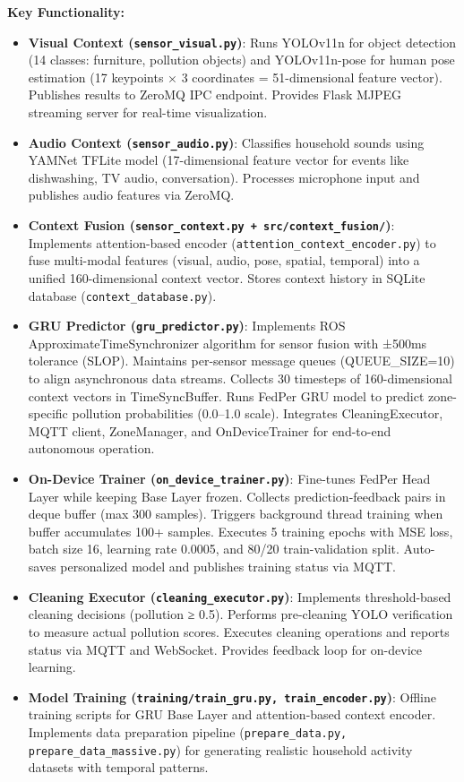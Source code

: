 \documentclass[conference]{IEEEtran}
\begin{document}
\textbf{Key Functionality:}
\begin{itemize}
    \item \textbf{Visual Context (\texttt{sensor\_visual.py})}: Runs YOLOv11n for object detection (14 classes: furniture, pollution objects) and YOLOv11n-pose for human pose estimation (17 keypoints × 3 coordinates = 51-dimensional feature vector). Publishes results to ZeroMQ IPC endpoint. Provides Flask MJPEG streaming server for real-time visualization.
    \item \textbf{Audio Context (\texttt{sensor\_audio.py})}: Classifies household sounds using YAMNet TFLite model (17-dimensional feature vector for events like dishwashing, TV audio, conversation). Processes microphone input and publishes audio features via ZeroMQ.
    \item \textbf{Context Fusion (\texttt{sensor\_context.py + src/context\_fusion/})}: Implements attention-based encoder (\texttt{attention\_context\_encoder.py}) to fuse multi-modal features (visual, audio, pose, spatial, temporal) into a unified 160-dimensional context vector. Stores context history in SQLite database (\texttt{context\_database.py}).
    \item \textbf{GRU Predictor (\texttt{gru\_predictor.py})}: Implements ROS ApproximateTimeSynchronizer algorithm for sensor fusion with ±500ms tolerance (SLOP). Maintains per-sensor message queues (QUEUE\_SIZE=10) to align asynchronous data streams. Collects 30 timesteps of 160-dimensional context vectors in TimeSyncBuffer. Runs FedPer GRU model to predict zone-specific pollution probabilities (0.0–1.0 scale). Integrates CleaningExecutor, MQTT client, ZoneManager, and OnDeviceTrainer for end-to-end autonomous operation.
    \item \textbf{On-Device Trainer (\texttt{on\_device\_trainer.py})}: Fine-tunes FedPer Head Layer while keeping Base Layer frozen. Collects prediction-feedback pairs in deque buffer (max 300 samples). Triggers background thread training when buffer accumulates 100+ samples. Executes 5 training epochs with MSE loss, batch size 16, learning rate 0.0005, and 80/20 train-validation split. Auto-saves personalized model and publishes training status via MQTT.
    \item \textbf{Cleaning Executor (\texttt{cleaning\_executor.py})}: Implements threshold-based cleaning decisions (pollution ≥ 0.5). Performs pre-cleaning YOLO verification to measure actual pollution scores. Executes cleaning operations and reports status via MQTT and WebSocket. Provides feedback loop for on-device learning.
    \item \textbf{Model Training (\texttt{training/train\_gru.py, train\_encoder.py})}: Offline training scripts for GRU Base Layer and attention-based context encoder. Implements data preparation pipeline (\texttt{prepare\_data.py, prepare\_data\_massive.py}) for generating realistic household activity datasets with temporal patterns.
\end{itemize}
\end{document}
